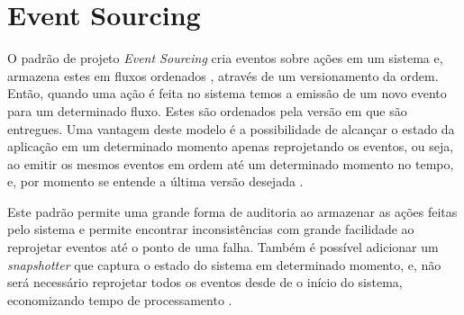 \section{Event Sourcing}

O padrão de projeto \textit{Event Sourcing} cria eventos sobre ações em um
sistema e, armazena estes em fluxos ordenados \cite{event-sourcing},
através de um versionamento da ordem. Então, quando uma ação é feita no sistema
temos a emissão de um novo evento para um determinado fluxo. Estes são ordenados
pela versão em que são entregues. Uma vantagem deste modelo é a possibilidade
de alcançar o estado da aplicação em um determinado momento apenas reprojetando
os eventos, ou seja, ao emitir os mesmos eventos em ordem até um determinado
momento no tempo, e, por momento se entende a última versão desejada
\cite{event-sourcing}.

Este padrão permite uma grande forma de auditoria ao armazenar as ações
feitas pelo sistema e permite encontrar inconsistências com grande facilidade
ao reprojetar eventos até o ponto de uma falha. Também é possível adicionar
um \textit{snapshotter} que captura o estado do sistema em determinado
momento, e, não será necessário reprojetar todos os eventos desde de o início
do sistema, economizando tempo de processamento \cite{event-sourcing}.
